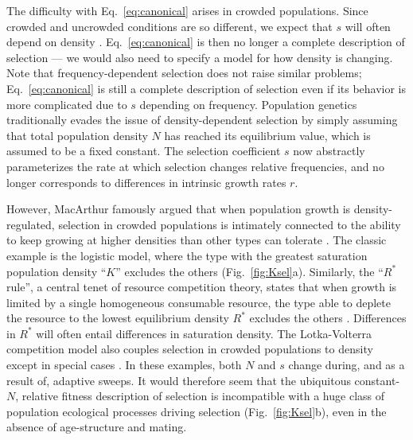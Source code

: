 \documentclass[12pt]{article}
\begin{document}
The difficulty with Eq.~\eqref{eq:canonical} arises in crowded populations. Since crowded and uncrowded conditions are so different, we expect that $s$ will often depend on density \citep{travis_2013}. Eq.~\eqref{eq:canonical} is then no longer a complete description of selection --- we would also need to specify a model for how density is changing. Note that frequency-dependent selection does not raise similar problems; Eq.~\eqref{eq:canonical} is still a complete description of selection even if its behavior is more complicated due to $s$ depending on frequency. Population genetics traditionally evades the issue of density-dependent selection by simply assuming that total population density $N$ has reached its equilibrium value, which is assumed to be a fixed constant. The selection coefficient $s$ now abstractly parameterizes the rate at which selection changes relative frequencies, and no longer corresponds to differences in intrinsic growth rates $r$. 

However, MacArthur famously argued that when population growth is density-regulated, selection in crowded populations is intimately connected to the ability to keep growing at higher densities than other types can tolerate \citep{macarthur_1967}. The classic example is the logistic model, where the type with the greatest saturation population density ``$K$'' excludes the others (Fig.~\ref{fig:Ksel}a). Similarly, the ``$R^*$ rule'', a central tenet of resource competition theory, states that when growth is limited by a single homogeneous consumable resource, the type able to deplete the resource to the lowest equilibrium density $R^*$ excludes the others \citep{grover_1997}. Differences in $R^*$ will often entail differences in saturation density. The Lotka-Volterra competition model also couples selection in crowded populations to density except in special cases \citep{smouse_1976,mallet_2012}. In these examples, both $N$ and $s$ change during, and as a result of, adaptive sweeps. It would therefore seem that the ubiquitous constant-$N$, relative fitness description of selection is incompatible with a huge class of population ecological processes driving selection (Fig.~\ref{fig:Ksel}b), even in the absence of age-structure and mating.
\end{document}
